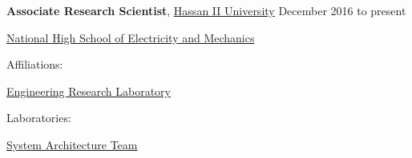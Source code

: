 \documentclass[10pt]{article}
\begin{document}
\textbf{Associate Research Scientist},
            \href{http://www.ensem.ac.ma/}{Hassan II University}
                    \hfill {December 2016 to present}
\begin{innerlist}

    \item[] \href{http://www.ensem.ac.ma/}{National High School of Electricity and Mechanics}
    \begin{innerlist}
        \item Affiliations:
            \begin{innerlist}
                \item \href{http://www.ensem.ac.ma}{Engineering Research Laboratory}
            \end{innerlist}
        \item Laboratories:
            \begin{innerlist}
                \item \href{http://www.ensem.ac.ma}{System Architecture Team}
            \end{innerlist}
    \end{innerlist}

\end{innerlist}
\end{document}
